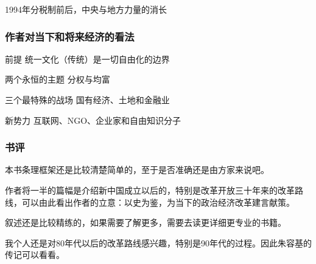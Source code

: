 1994年分税制前后，中央与地方力量的消长

\subsubsection{作者对当下和将来经济的看法}
\begin{description*}
	\item[前提] 统一文化（传统）是一切自由化的边界
	\item[两个永恒的主题] 分权与均富
	\item[三个最特殊的战场] 国有经济、土地和金融业
	\item[新势力] 互联网、NGO、企业家和自由知识分子
\end{description*}

\subsubsection{书评}
本书条理框架还是比较清楚简单的，至于是否准确还是由方家来说吧。

作者将一半的篇幅是介绍新中国成立以后的，特别是改革开放三十年来的改革路线，可以由此看出作者的立意：以史为鉴，为当下的政治经济改革建言献策。

叙述还是比较精练的，如果需要了解更多，需要去读更详细更专业的书籍。

我个人还是对80年代以后的改革路线感兴趣，特别是90年代的过程。因此朱容基的传记可以看看。